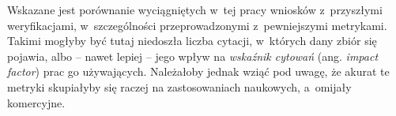 Wskazane jest porównanie wyciągniętych w~tej pracy wniosków z~przyszłymi weryfikacjami, w~szczególności przeprowadzonymi z~pewniejszymi metrykami.
Takimi mogłyby być tutaj niedoszła liczba cytacji, w~których dany zbiór się pojawia, albo -- nawet lepiej -- jego wpływ na \emph{wskaźnik cytowań} (ang. \emph{impact factor}) prac go używających.
Należałoby jednak wziąć pod uwagę, że akurat te metryki skupiałyby się raczej na zastosowaniach naukowych, a~omijały komercyjne.

